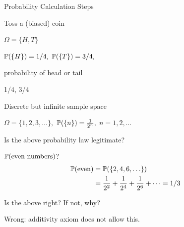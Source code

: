 \documentclass[fleqn,aspectratio=169]{beamer}
\begin{document}
\begin{frame}{Probability Calculation Steps}


{
Toss a (biased) coin

\plitemsep 0.1in

\bce
\item $\Omega = \{H,T \}$ 

\item $\mathbb{P}( \{H \} ) = 1/4,$ $\mathbb{P}( \{T \} ) = 3/4,$

\item probability of head or tail

\item 1/4, 3/4
\ece
}
\end{frame}

\begin{frame}{Discrete but infinite sample space}


\plitemsep 0.07in

\bci
\item $\Omega = \{1,2, 3, \ldots \},$  $\mathbb{P}( \{ n \} ) = \frac{1}{2^n},$ $n=1,2, \ldots$ 

\item<2-> Is the above probability law legitimate? 
{
}
\vspace{-0.3cm}
\item<4-> $\mathbb{P}( \text{even numbers} )$?
{
\begin{align*}
 \mathbb{P}( \text{even} ) 
 &= \mathbb{P}( \{2,4, 6, \ldots \} ) \cr    
 &= \frac{1}{2^2} + \frac{1}{2^4} + \frac{1}{2^6} + \cdots = 1/3
\end{align*}}

\item<6-> Is the above right? If not, why?
\bci
\item<7-> Wrong:  additivity axiom does not allow this.
\eci

\eci

\end{frame}
\end{document}
